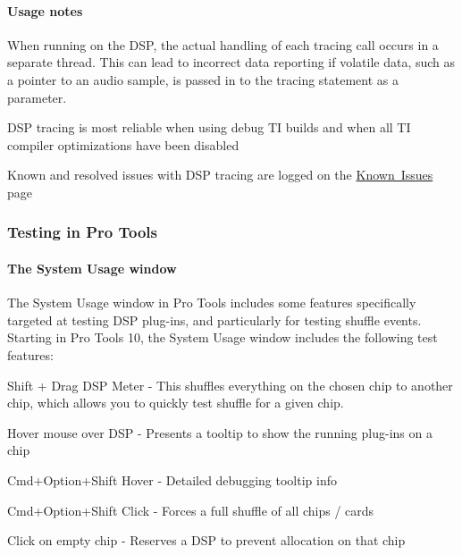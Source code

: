 \hypertarget{a00832_subsubsection__usage_notes_}{}\paragraph{Usage notes}\label{a00832_subsubsection__usage_notes_}

\begin{DoxyItemize}
\item When running on the D\+SP, the actual handling of each tracing call occurs in a separate thread. This can lead to incorrect data reporting if volatile data, such as a pointer to an audio sample, is passed in to the tracing statement as a parameter.  
\item D\+SP tracing is most reliable when using debug TI builds and when all TI compiler optimizations have been disabled  
\item Known and resolved issues with D\+SP tracing are logged on the \mbox{\hyperlink{a00846}{Known Issues}} page  
\end{DoxyItemize}

\hypertarget{a00832_subsection__testing_in_pro_tools}{}\subsubsection{Testing in Pro Tools}\label{a00832_subsection__testing_in_pro_tools}
 \hypertarget{a00832_subsubsection__the_system_usage_window_}{}\paragraph{The System Usage window}\label{a00832_subsubsection__the_system_usage_window_}
 The System Usage window in Pro Tools includes some features specifically targeted at testing D\+SP plug-\/ins, and particularly for testing shuffle events. Starting in Pro Tools 10, the System Usage window includes the following test features\+: 
\begin{DoxyItemize}
\item Shift + Drag D\+SP Meter -\/ This shuffles everything on the chosen chip to another chip, which allows you to quickly test shuffle for a given chip.  
\item Hover mouse over D\+SP -\/ Presents a tooltip to show the running plug-\/ins on a chip  
\item Cmd+\+Option+\+Shift Hover -\/ Detailed debugging tooltip info  
\item Cmd+\+Option+\+Shift Click -\/ Forces a full shuffle of all chips / cards 
\item Click on empty chip -\/ Reserves a D\+SP to prevent allocation on that chip 
\end{DoxyItemize}

